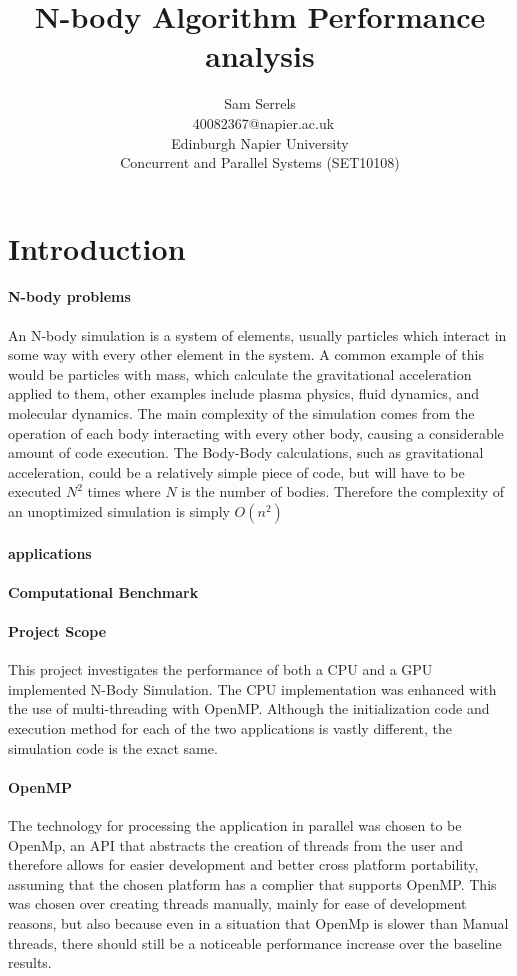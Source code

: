 \documentclass[conference]{acmsiggraph}
\title{N-body Algorithm Performance analysis}
\author{Sam Serrels\\\ 40082367@napier.ac.uk \\
Edinburgh Napier University\\
Concurrent and Parallel Systems (SET10108)}
\begin{document}
\maketitle

\section{Introduction}

\paragraph{N-body problems}
An N-body simulation is a system of elements, usually particles which interact in some way with every other element in the system. A common example of this would be particles with mass, which calculate the gravitational acceleration applied to them, other examples include plasma physics, fluid dynamics,
and molecular dynamics.
The main complexity of the simulation comes from the operation of each body interacting with every other body, causing a considerable amount of code execution. The Body-Body calculations, such as gravitational acceleration, could be a relatively simple piece of code, but will have to be executed $N^2$ times where $N$ is the number of bodies. Therefore the complexity of an unoptimized simulation is simply $O(n^2)$

\paragraph{applications}

\paragraph{Computational Benchmark}

\paragraph{Project Scope}
This project investigates the performance of both a CPU and a GPU implemented N-Body Simulation. The CPU implementation was enhanced with the use of multi-threading with OpenMP. Although the initialization code and execution method for each of the two applications is vastly different, the simulation code is the exact same.

\paragraph{OpenMP}
The technology for processing the application in parallel was chosen to be OpenMp, an API that abstracts the creation of threads from the user and therefore allows for easier development and better cross platform portability, assuming that the chosen platform has a complier that supports OpenMP.
This was chosen over creating threads manually, mainly for ease of development reasons, but also because even in a situation that OpenMp is slower than Manual threads, there should still be a noticeable performance increase over the baseline results.
\end{document}
